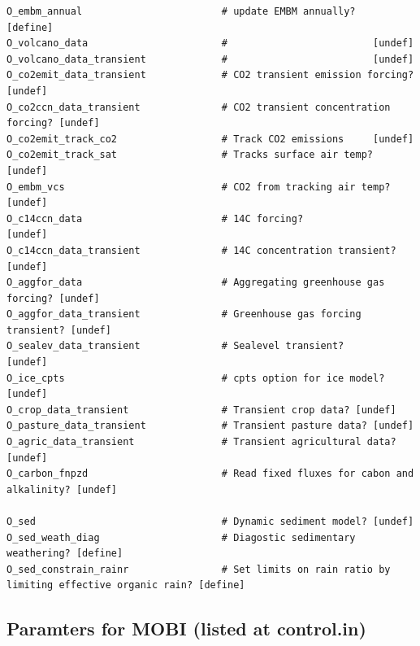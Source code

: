 \documentclass[a4paper]{article}
\begin{document}
\begin{lstlisting}[frame=single,basicstyle=\scriptsize,commentstyle=\color{blue}]
O_embm_annual                        # update EMBM annually?   [define]
O_volcano_data                       #                         [undef]
O_volcano_data_transient             #                         [undef]
O_co2emit_data_transient             # CO2 transient emission forcing? [undef]
O_co2ccn_data_transient              # CO2 transient concentration forcing? [undef]
O_co2emit_track_co2                  # Track CO2 emissions     [undef]
O_co2emit_track_sat                  # Tracks surface air temp? [undef]
O_embm_vcs                           # CO2 from tracking air temp? [undef]
O_c14ccn_data                        # 14C forcing?             [undef]
O_c14ccn_data_transient              # 14C concentration transient? [undef]
O_aggfor_data                        # Aggregating greenhouse gas forcing? [undef]
O_aggfor_data_transient              # Greenhouse gas forcing transient? [undef]
O_sealev_data_transient              # Sealevel transient?      [undef]
O_ice_cpts                           # cpts option for ice model? [undef]
O_crop_data_transient                # Transient crop data? [undef]
O_pasture_data_transient             # Transient pasture data? [undef]
O_agric_data_transient               # Transient agricultural data? [undef]
O_carbon_fnpzd                       # Read fixed fluxes for cabon and alkalinity? [undef]

O_sed                                # Dynamic sediment model? [undef]
O_sed_weath_diag                     # Diagostic sedimentary weathering? [define]
O_sed_constrain_rainr                # Set limits on rain ratio by limiting effective organic rain? [define]
\end{lstlisting}

\subsection{Paramters for MOBI (listed at control.in)} \label{subsection:mobi_params}
\end{document}
